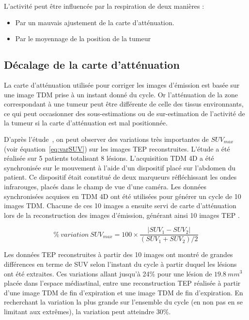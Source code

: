 L'activité peut être influencée par la respiration de deux manières : 
\begin{itemize}
 \item Par un mauvais ajustement de la carte d'atténuation.
 \item Par le moyennage de la position de la tumeur
\end{itemize}


\subsection{Décalage de la carte d'atténuation}

La carte d'atténuation utilisée pour corriger les images d'émission est basée sur une image TDM prise à un instant donné du cycle. Or l'atténuation de la zone correspondant à une tumeur peut être différente de celle des tissus environnants, ce qui peut occasionner des sous-estimations ou de sur-estimation de l'activité de la tumeur si la carte d'atténuation est mal positionnée.

D'après l'étude~\cite{erdi2004ct}, on peut observer des variations très importantes de $SUV_{max}$ (voir équation~\ref{eq:varSUV}) sur les images TEP reconstruites. L'étude a été réalisée sur 5 patients totalisant 8 lésions. L'acquisition TDM 4D a été synchronisée sur le mouvement à l'aide d'un dispositif placé sur l'abdomen du patient. Ce dispositif était constitué de deux marqueurs réfléchissant les ondes infrarouges, placés dans le champ de vue d'une caméra. Les données synchronisées acquises en TDM 4D ont été utilisées pour générer un cycle de 10 images TDM. Chacune de ces 10 images a ensuite servi de carte d'atténuation lors de la reconstruction des images d'émission, générant ainsi 10 images TEP .

\begin{equation}
\label{eq:varSUV}
 \%~variation~SUV_{max} = 100 \times \frac{ | SUV_1 - SUV_2 | }{ (SUV_1 + SUV_2) / 2 }
\end{equation}


Les données TEP reconstruites à partir des 10 images ont montré de grandes différences en terme de SUV selon l'instant du cycle à partir duquel les lésions ont été extraites.
Ces variations allant jusqu'à 24\% pour une lésion de $19.8~mm^3$ placée dans l'espace médiastinal, entre une reconstruction TEP réalisée à partir d'une image TDM de fin d'expiration et une image TDM de fin d'expiration. En recherchant la variation la plus grande sur l'ensemble du cycle (en non pas en se limitant aux extrêmes), la variation peut atteindre 30\%.

